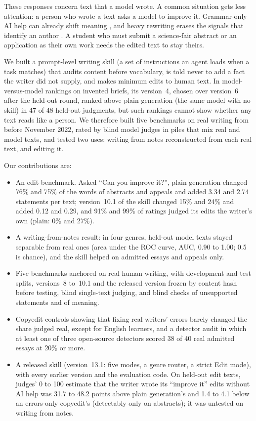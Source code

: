 \documentclass[11pt]{article}
\newcommand{\shipver}{13.1}
\begin{document}
These responses concern text that a model wrote. A common situation gets less attention: a person who wrote a text asks a model to improve it. Grammar-only AI help can already shift meaning \citep{abdulhai2026distort}, and heavy rewriting erases the signals that identify an author \citep{malik2026erased}. A student who must submit a science-fair abstract or an application as their own work needs the edited text to stay theirs.

We built a prompt-level writing skill (a set of instructions an agent loads when a task matches) that audits content before vocabulary, is told never to add a fact the writer did not supply, and makes minimum edits to human text. In model-versus-model rankings on invented briefs, its version~4, chosen over version~6 after the held-out round, ranked above plain generation (the same model with no skill) in 47 of 48 held-out judgments, but such rankings cannot show whether any text reads like a person. We therefore built five benchmarks on real writing from before November 2022, rated by blind model judges in piles that mix real and model texts, and tested two uses: writing from notes reconstructed from each real text, and editing it.

Our contributions are:
\begin{itemize}
  \item An edit benchmark. Asked ``Can you improve it?'', plain generation changed 76\% and 75\% of the words of abstracts and appeals and added 3.34 and 2.74 statements per text; version~10.1 of the skill changed 15\% and 24\% and added 0.12 and 0.29, and 91\% and 99\% of ratings judged its edits the writer's own (plain: 0\% and 27\%).
  \item A writing-from-notes result: in four genres, held-out model texts stayed separable from real ones (area under the ROC curve, AUC, 0.90 to 1.00; 0.5 is chance), and the skill helped on admitted essays and appeals only.
  \item Five benchmarks anchored on real human writing, with development and test splits, versions~8 to~10.1 and the released version frozen by content hash before testing, blind single-text judging, and blind checks of unsupported statements and of meaning.
  \item Copyedit controls showing that fixing real writers' errors barely changed the share judged real, except for English learners, and a detector audit in which at least one of three open-source detectors scored 38 of 40 real admitted essays at 20\% or more.
  \item A released skill (version~\shipver{}: five modes, a genre router, a strict Edit mode), with every earlier version and the evaluation code. On held-out edit texts, judges' 0 to 100 estimate that the writer wrote its ``improve it'' edits without AI help was 31.7 to 48.2 points above plain generation's and 1.4 to 4.1 below an errors-only copyedit's (detectably only on abstracts); it was untested on writing from notes.
\end{itemize}
\end{document}
